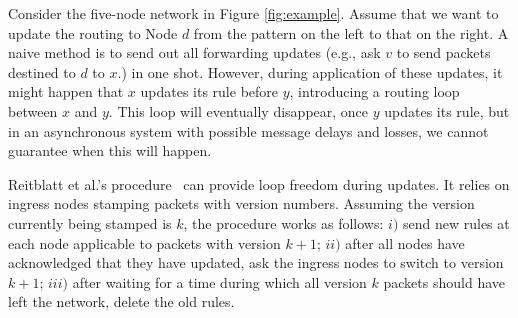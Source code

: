 Consider the five-node network in Figure \ref{fig:example}. Assume that we want to update the routing to Node $d$ from the pattern on the left to that on the right. A naive method is to send out all forwarding updates (e.g., ask $v$ to send packets destined to $d$ to $x$.) in one shot. However, during application of these updates, it might happen that $x$ updates its rule before $y$, introducing a routing loop between $x$ and $y$. This loop will eventually disappear, once $y$ updates its rule, but in an asynchronous system with possible message delays and losses, we cannot guarantee when this will happen. 


Reitblatt et al.'s procedure~\cite{safeupdate} can provide loop freedom during updates. It  relies on ingress nodes stamping packets with version numbers. Assuming the version currently being stamped is $k$, the procedure works as follows: $i)$ send new rules at each node applicable to packets with version $k+1$; $ii)$ after all nodes have acknowledged that they have updated, ask the ingress nodes to switch to version $k+1$; $iii)$ after waiting for a time during which all version $k$ packets should have left the network, delete the old rules.


